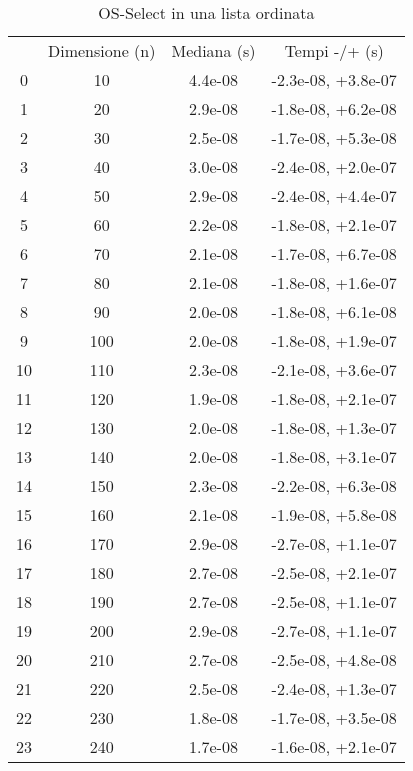 \begin{table}
\centering
\caption{OS-Select in una lista ordinata}
\label{OS-Select in una lista ordinata}
\begin{adjustbox}{width=1\textwidth/2}
\begin{tabular}{|c|c|c|c|}
\hline
 & Dimensione (n) & Mediana (s) & Tempi -/+ (s) \\
0 & 10 & 4.4e-08 & -2.3e-08, +3.8e-07 \\
\cline{1-4}
1 & 20 & 2.9e-08 & -1.8e-08, +6.2e-08 \\
\cline{1-4}
2 & 30 & 2.5e-08 & -1.7e-08, +5.3e-08 \\
\cline{1-4}
3 & 40 & 3.0e-08 & -2.4e-08, +2.0e-07 \\
\cline{1-4}
4 & 50 & 2.9e-08 & -2.4e-08, +4.4e-07 \\
\cline{1-4}
5 & 60 & 2.2e-08 & -1.8e-08, +2.1e-07 \\
\cline{1-4}
6 & 70 & 2.1e-08 & -1.7e-08, +6.7e-08 \\
\cline{1-4}
7 & 80 & 2.1e-08 & -1.8e-08, +1.6e-07 \\
\cline{1-4}
8 & 90 & 2.0e-08 & -1.8e-08, +6.1e-08 \\
\cline{1-4}
9 & 100 & 2.0e-08 & -1.8e-08, +1.9e-07 \\
\cline{1-4}
10 & 110 & 2.3e-08 & -2.1e-08, +3.6e-07 \\
\cline{1-4}
11 & 120 & 1.9e-08 & -1.8e-08, +2.1e-07 \\
\cline{1-4}
12 & 130 & 2.0e-08 & -1.8e-08, +1.3e-07 \\
\cline{1-4}
13 & 140 & 2.0e-08 & -1.8e-08, +3.1e-07 \\
\cline{1-4}
14 & 150 & 2.3e-08 & -2.2e-08, +6.3e-08 \\
\cline{1-4}
15 & 160 & 2.1e-08 & -1.9e-08, +5.8e-08 \\
\cline{1-4}
16 & 170 & 2.9e-08 & -2.7e-08, +1.1e-07 \\
\cline{1-4}
17 & 180 & 2.7e-08 & -2.5e-08, +2.1e-07 \\
\cline{1-4}
18 & 190 & 2.7e-08 & -2.5e-08, +1.1e-07 \\
\cline{1-4}
19 & 200 & 2.9e-08 & -2.7e-08, +1.1e-07 \\
\cline{1-4}
20 & 210 & 2.7e-08 & -2.5e-08, +4.8e-08 \\
\cline{1-4}
21 & 220 & 2.5e-08 & -2.4e-08, +1.3e-07 \\
\cline{1-4}
22 & 230 & 1.8e-08 & -1.7e-08, +3.5e-08 \\
\cline{1-4}
23 & 240 & 1.7e-08 & -1.6e-08, +2.1e-07 \\

\end{tabular}
\end{adjustbox}
\end{table}
